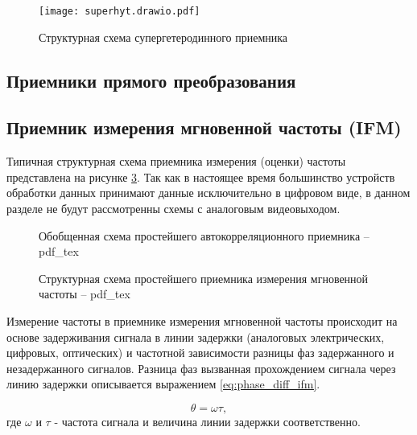 \begin{figure}[ht]
	\centering
	\texttt{[image: superhyt.drawio.pdf]}	
	\caption{Структурная схема супергетеродинного приемника}
	\label{ct:superhyt}
\end{figure}

\subsection{Приемники прямого преобразования}

\subsection{Приемник измерения мгновенной частоты (IFM)}

Типичная структурная схема приемника измерения (оценки) частоты представлена на рисунке \ref{ct:ifm_struct_simple}. Так как в настоящее время большинство устройств обработки данных принимают данные исключительно в цифровом виде, в данном разделе не будут рассмотренны схемы с аналоговым видеовыходом.

\begin{figure}[ht]
	\centering
	\resizebox{\linewidth}{!}{}
	
	\caption{Обобщенная схема простейшего автокорреляционного приемника -- pdf\_tex}
	\label{ct:autocorr_struct_simple}
\end{figure}

\begin{figure}[ht]
	\centering
	\resizebox{\linewidth}{!}{}
	
	\caption{Структурная схема простейшего приемника измерения мгновенной частоты -- pdf\_tex}
	\label{ct:ifm_struct_simple}
\end{figure}

Измерение частоты в приемнике измерения мгновенной частоты происходит на основе задерживания сигнала в линии задержки (аналоговых электрических, цифровых, оптических) и частотной зависимости разницы фаз задержанного и незадержанного сигналов. Разница фаз вызванная прохождением сигнала через линию задержки описывается выражением \eqref{eq:phase_diff_ifm}.

\begin{equation}
	\theta = \omega \tau ,
	\label{eq:phase_diff_ifm}
\end{equation}
где \(\omega\) и \(\tau\) - частота сигнала и величина линии задержки соответственно.

